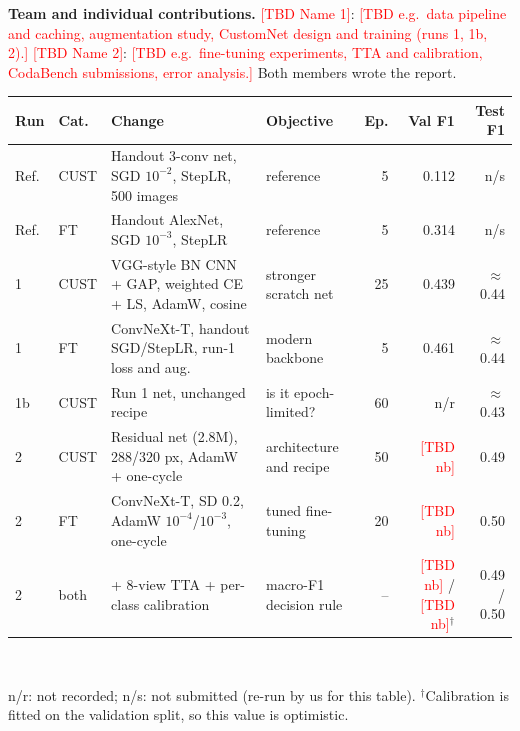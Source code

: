 \documentclass[10pt]{article}
\newcommand{\TBD}[1]{\textcolor{red}{[TBD #1]}}
\newcommand{\CustomValPlain}{\TBD{nb}}
\newcommand{\CustomValCal}{\TBD{nb}}
\newcommand{\FTValPlain}{\TBD{nb}}
\newcommand{\FTValCal}{\TBD{nb}}
\begin{document}
\textbf{Team and individual contributions.} \TBD{Name 1}: \TBD{e.g.\ data pipeline and caching, augmentation study, CustomNet design and training (runs 1, 1b, 2).} \TBD{Name 2}: \TBD{e.g.\ fine-tuning experiments, TTA and calibration, CodaBench submissions, error analysis.} Both members wrote the report.

\clearpage

\noindent\begin{minipage}{\linewidth}
\centering\footnotesize
{}\label{tab:exp}
\setlength{\tabcolsep}{3.5pt}
\begin{tabular}{@{}llp{6.6cm}p{3.1cm}rrr@{}}
\toprule
Run & Cat. & Change & Objective & Ep. & Val F1 & Test F1\\
\midrule
Ref. & CUST & Handout 3-conv net, SGD $10^{-2}$, StepLR, 500 images & reference & 5 & 0.112 & n/s \\
Ref. & FT & Handout AlexNet, SGD $10^{-3}$, StepLR & reference & 5 & 0.314 & n/s \\
1 & CUST & VGG-style BN CNN + GAP, weighted CE + LS, AdamW, cosine & stronger scratch net & 25 & 0.439 & $\approx$0.44 \\
1 & FT & ConvNeXt-T, handout SGD/StepLR, run-1 loss and aug. & modern backbone & 5 & 0.461 & $\approx$0.44 \\
1b & CUST & Run 1 net, unchanged recipe & is it epoch-limited? & 60 & n/r & $\approx$0.43 \\
2 & CUST & Residual net (2.8M), 288/320 px, AdamW + one-cycle & architecture and recipe & 50 & \CustomValPlain & 0.49 \\
2 & FT & ConvNeXt-T, SD 0.2, AdamW $10^{-4}$/$10^{-3}$, one-cycle & tuned fine-tuning & 20 & \FTValPlain & 0.50 \\
2 & both & + 8-view TTA + per-class calibration & macro-F1 decision rule & -- & \CustomValCal{} / \FTValCal{}$^{\dagger}$ & 0.49 / 0.50 \\
\bottomrule
\end{tabular}\\[1pt]
\raggedright\scriptsize n/r: not recorded; n/s: not submitted (re-run by us for this table). $^{\dagger}$Calibration is fitted on the validation split, so this value is optimistic.
\end{minipage}
\end{document}

